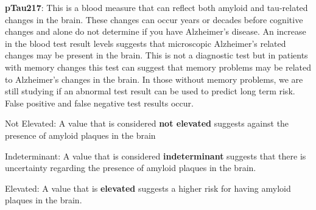 \textbf{pTau217}: This is a blood measure that can reflect both amyloid and
tau-related changes in the brain. These changes can occur years or decades
before cognitive changes and alone do not determine if you have Alzheimer’s
disease. An increase in the blood test result levels suggests that microscopic
Alzheimer’s related changes may be present in the brain. This is not a
diagnostic test but in patients with memory changes this test can suggest that
memory problems may be related to Alzheimer’s changes in the brain.  In those
without memory problems, we are still studying if an abnormal test result can be
used to predict long term risk. False positive and false negative test results
occur.

Not Elevated: A value that is considered \textbf{not elevated} suggests against
the presence of amyloid plaques in the brain

Indeterminant: A value that is considered \textbf{indeterminant} suggests that
there is uncertainty regarding the presence of amyloid plaques in the brain.

Elevated: A value that is \textbf{elevated} suggests a higher risk for having
amyloid plaques in the brain.

